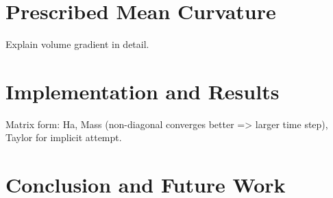 \documentclass[11pt]{article}
\begin{document}
\section{Prescribed Mean Curvature}

Explain volume gradient in detail.

\section{Implementation and Results}

Matrix form: Ha, Mass (non-diagonal converges better => larger time step), Taylor for implicit attempt.

\section{Conclusion and Future Work}



\end{document}
